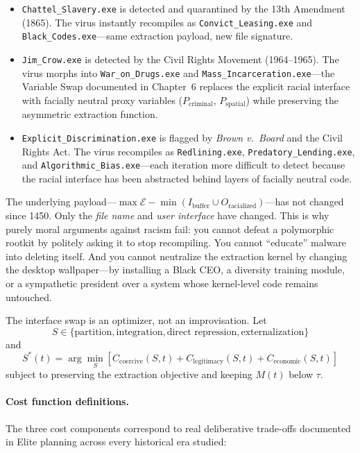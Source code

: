 \documentclass[12pt,openany]{book}
\begin{document}
\begin{itemize}
    \item \texttt{Chattel\_Slavery.exe} is detected and quarantined by the 13th Amendment (1865). The virus instantly recompiles as \texttt{Convict\_Leasing.exe} and \texttt{Black\_Codes.exe}---same extraction payload, new file signature.

    \item \texttt{Jim\_Crow.exe} is detected by the Civil Rights Movement (1964--1965). The virus morphs into \texttt{War\_on\_Drugs.exe} and \texttt{Mass\_Incarceration.exe}---the Variable Swap documented in Chapter~6 replaces the explicit racial interface with facially neutral proxy variables ($P_{\text{criminal}}$, $P_{\text{spatial}}$) while preserving the asymmetric extraction function.

    \item \texttt{Explicit\_Discrimination.exe} is flagged by \textit{Brown v.\ Board} and the Civil Rights Act. The virus recompiles as \texttt{Redlining.exe}, \texttt{Predatory\_Lending.exe}, and \texttt{Algorithmic\_Bias.exe}---each iteration more difficult to detect because the racial interface has been abstracted behind layers of facially neutral code.
\end{itemize}

The underlying payload---$\max \mathcal{E} - \min(I_{\text{buffer}} \cup O_{\text{racialized}})$---has not changed since 1450. Only the \textit{file name} and \textit{user interface} have changed. This is why purely moral arguments against racism fail: you cannot defeat a polymorphic rootkit by politely asking it to stop recompiling. You cannot ``educate'' malware into deleting itself. And you cannot neutralize the extraction kernel by changing the desktop wallpaper---by installing a Black CEO, a diversity training module, or a sympathetic president over a system whose kernel-level code remains untouched.

The interface swap is an optimizer, not an improvisation. Let
\[
S \in \{\text{partition},\text{integration},\text{direct repression},\text{externalization}\}
\]
and
\[
S^\ast(t) = \arg\min_{S} \left[C_{\text{coercive}}(S,t) + C_{\text{legitimacy}}(S,t) + C_{\text{economic}}(S,t)\right]
\]
subject to preserving the extraction objective and keeping $M(t)$ below $\tau$.

\paragraph{Cost function definitions.}
The three cost components correspond to real deliberative trade-offs documented in Elite planning across every historical era studied:
\end{document}
